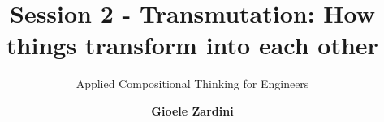 \title{Session 2 - Transmutation: How things transform into each other}

\subtitle{Applied Compositional Thinking for Engineers}

\date{}

\author[Applied Compositional Thinking for Engineers]
{
    \textbf{Gioele Zardini}
}


\institute[ETHZ]
{
        \begin{center}
        \end{center}
}

